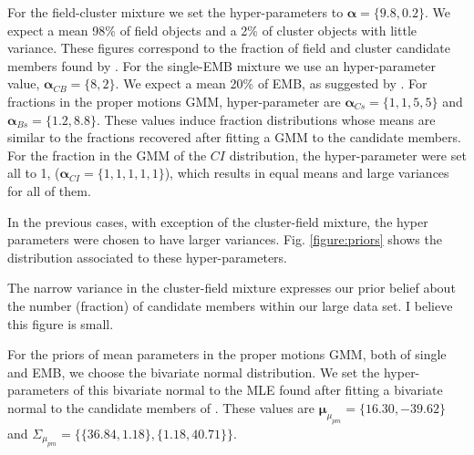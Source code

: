 For the field-cluster mixture we set the hyper-parameters to $\boldsymbol{\alpha}=\{9.8,0.2\}$. We expect a mean 98\% of field objects and a 2\% of cluster objects with little variance. These figures correspond to the fraction of field and cluster candidate members found by \citet{Bouy2015}. 
For the single-EMB mixture we use an hyper-parameter value, $\boldsymbol{\alpha}_{CB}=\{8,2\}$. We expect a mean 20\% of EMB, as suggested by \citet{Bouy2015}. 
For fractions in the proper motions GMM, hyper-parameter are $\boldsymbol{\alpha}_{Cs}=\{1,1,5,5\}$ and $\boldsymbol{\alpha}_{Bs}=\{1.2,8.8\}$. These values induce fraction distributions whose means are similar to the fractions recovered after fitting a GMM to the \citet{Bouy2015} candidate members. 
For the fraction in the GMM of the $CI$ distribution, the hyper-parameter were set all to 1, ($\boldsymbol{\alpha}_{CI}=\{1,1,1,1,1\}$), which results in equal means and large variances for all of them.

In the previous cases, with exception of the cluster-field mixture, the hyper parameters were chosen to have larger variances. Fig.  \ref{figure:priors} shows the distribution associated to these hyper-parameters.

The narrow variance in the cluster-field mixture expresses our prior belief about the number (fraction) of candidate members within our large data set. I believe this figure is small.

\begin{figure*}[htbp]
\begin{center}
\caption{Prior distribution of fraction parameters. From top left to bottom right, the distributions of field fraction ($\pi$), equal mass binaries fraction ($1-\pi_{CB}$), and the cluster ($\pi_{Cs}$) and equal-mass binaries ($\pi_{Bs}$) fractions in their proper motion GMM, respectively.}
\label{figure:priors}
\end{center}
\end{figure*}


For the priors of mean parameters in the proper motions GMM, both of single and EMB, we choose the bivariate normal distribution. We set the hyper-parameters of this bivariate normal to the MLE found after fitting a bivariate normal to the candidate members of \citet{Bouy2015}. These values are $\boldsymbol{\mu}_{\mu_{pm}}=\{16.30,-39.62\}$ and $\Sigma_{\mu_{pm}}=\{\{36.84,1.18\},\{1.18,40.71\}\}$. 

